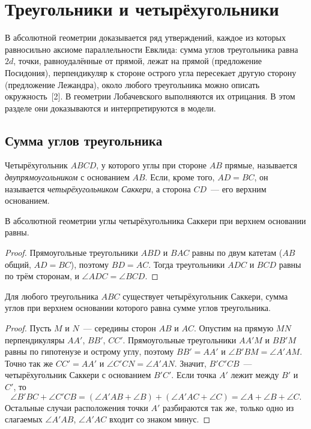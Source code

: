 \section{Треугольники и четырёхугольники}

В абсолютной геометрии доказывается ряд утверждений, каждое из которых равносильно аксиоме параллельности Евклида: сумма углов треугольника равна $2d$, точки, равноудалённые от прямой, лежат на прямой (предложение Посидония), перпендикуляр к стороне острого угла пересекает другую сторону (предложение Лежандра), около любого треугольника можно описать окружность~[2]. В геометрии Лобачевского выполняются их отрицания. В этом разделе они доказываются и интерпретируются в модели.

\subsection{Сумма углов треугольника}

\begin{definition}
Четырёхугольник $ABCD$, у которого углы при стороне $AB$ прямые, называется \emph{двупрямоугольником} с основанием $AB$. Если, кроме того, $AD=BC$, он называется \emph{четырёхугольником Саккери}, а сторона $CD$~--- его верхним основанием.
\end{definition}

\begin{lemma}\label{lem:sakkeri-ravny}
В абсолютной геометрии углы четырёхугольника Саккери при верхнем основании равны.
\end{lemma}
\begin{proof}
Прямоугольные треугольники $ABD$ и $BAC$ равны по двум катетам ($AB$ общий, $AD=BC$), поэтому $BD=AC$. Тогда треугольники $ADC$ и $BCD$ равны по трём сторонам, и $\angle ADC=\angle BCD$.
\end{proof}

\begin{lemma}\label{lem:treugolnik-sakkeri}
Для любого треугольника $ABC$ существует четырёхугольник Саккери, сумма углов при верхнем основании которого равна сумме углов треугольника.
\end{lemma}
\begin{proof}
Пусть $M$ и $N$~--- середины сторон $AB$ и $AC$. Опустим на прямую $MN$ перпендикуляры $AA'$, $BB'$, $CC'$. Прямоугольные треугольники $AA'M$ и $BB'M$ равны по гипотенузе и острому углу, поэтому $BB'=AA'$ и $\angle B'BM=\angle A'AM$. Точно так же $CC'=AA'$ и $\angle C'CN=\angle A'AN$. Значит, $B'C'CB$~--- четырёхугольник Саккери с основанием $B'C'$. Если точка $A'$ лежит между $B'$ и $C'$, то
\[
\angle B'BC+\angle C'CB=(\angle A'AB+\angle B)+(\angle A'AC+\angle C)=\angle A+\angle B+\angle C.
\]
Остальные случаи расположения точки $A'$ разбираются так же, только одно из слагаемых $\angle A'AB$, $\angle A'AC$ входит со знаком минус.
\end{proof}

